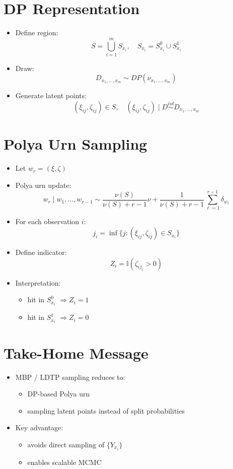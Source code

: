 \documentclass[12pt,oneside]{book}
\numberwithin{equation}{section}
\theoremstyle{definition}
\theoremstyle{plain}
\theoremstyle{remark}
\begin{document}
\section{DP Representation}

\begin{itemize}
\item Define region:
\[
S = \bigcup_{i=1}^m S_{x_i}, \quad S_{x_i} = S_{x_i}^0 \cup S_{x_i}^1
\]

\item Draw:
\[
D_{x_1,\dots,x_m} \sim DP(\nu_{x_1,\dots,x_m})
\]

\item Generate latent points:
\[
(\xi_{ij}, \zeta_{ij}) \in S, \quad
(\xi_{ij}, \zeta_{ij}) \mid D \overset{iid}{\sim} D_{x_1,\dots,x_m}
\]
\end{itemize}

\section{Polya Urn Sampling}

\begin{itemize}
\item Let $w_r = (\xi,\zeta)$

\item Polya urn update:
\[
w_r \mid w_1,\dots,w_{r-1}
\sim
\frac{\nu(S)}{\nu(S)+r-1}\nu
+
\frac{1}{\nu(S)+r-1}\sum_{\ell=1}^{r-1}\delta_{w_\ell}
\]

\item For each observation $i$:
\[
j_i = \inf \{ j : (\xi_{ij}, \zeta_{ij}) \in S_{x_i} \}
\]

\item Define indicator:
\[
Z_i = \mathbb{I}(\zeta_{ij_i} > 0)
\]

\item Interpretation:
\begin{itemize}
\item hit in $S_{x_i}^0$ $\Rightarrow Z_i=1$
\item hit in $S_{x_i}^1$ $\Rightarrow Z_i=0$
\end{itemize}
\end{itemize}

\section{Take-Home Message}

\begin{itemize}
\item MBP / LDTP sampling reduces to:
\begin{itemize}
\item DP-based Polya urn
\item sampling latent points instead of split probabilities
\end{itemize}

\item Key advantage:
\begin{itemize}
\item avoids direct sampling of $\{Y_{x_i}\}$
\item enables scalable MCMC
\end{itemize}
\end{itemize}
\end{document}
